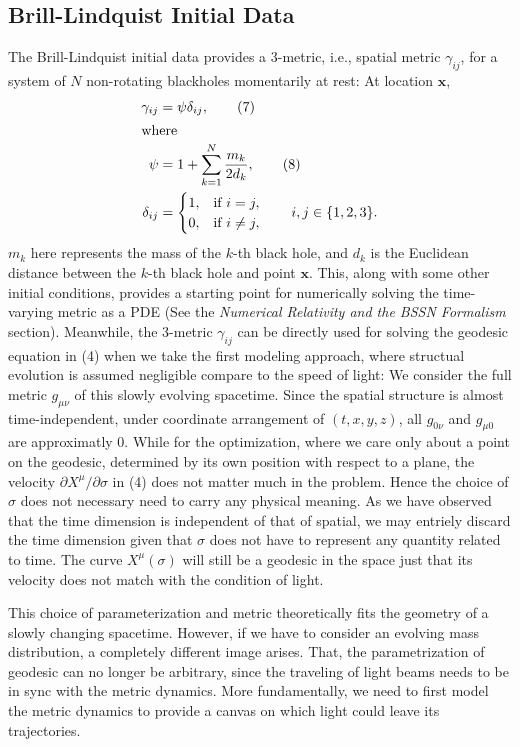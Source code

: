 \documentclass[conference]{IEEEtran}
\begin{document}
\subsection{Brill-Lindquist Initial Data}\label{AA}
The Brill-Lindquist initial data \cite{BLID}\cite{SID} provides a 3-metric, i.e., spatial metric $\gamma_{ij}$, 
for a system of $N$ non-rotating blackholes momentarily at rest: At location $\mathbf{x}$,
\begin{align*}
\gamma_{ij} &= \psi  \delta_{ij}, \tag{7}\\
\intertext{where}
\psi &= 1 + \sum_{k=1}^N \frac{m_k}{2d_k}, \tag{8}\\
\delta_{ij} &=
\begin{cases}
1, & \text{if } i = j,\\
0, & \text{if } i \neq j,
\end{cases}
\qquad i,j \in \{1,2,3\}.
\end{align*}
$m_k$ here represents the mass of the $k$-th black hole, and $d_k$ is the Euclidean 
distance between the $k$-th black hole and point $\mathbf{x}$. This, along with some other 
initial conditions, provides a starting point for numerically solving the 
time-varying metric as a PDE (See the \textit{Numerical Relativity and the BSSN Formalism} section). Meanwhile, the 
3-metric $\gamma_{ij}$ can be directly used for solving the geodesic equation in 
(4) when we take the first modeling approach, where structual evolution is assumed 
negligible compare to the speed of light: We consider the full metric $g_{\mu\nu}$ of 
this slowly evolving spacetime. Since the spatial structure is almost time-independent, under 
coordinate arrangement of $(t, x, y, z)$, all $g_{0\nu}$ and $g_{\mu0}$ are 
approximatly 0. While for the optimization, where we care only about a point on the geodesic, 
determined by its own position with respect to a plane, the velocity
$\partial X^\mu /\partial \sigma$ in (4) does not matter much in the problem. Hence the choice 
of $\sigma$ does not necessary need to carry any physical meaning. As we have observed that 
the time dimension is independent of that of spatial, we may entriely discard 
the time dimension given that $\sigma$ does not have to represent any quantity related to time. 
The curve $X^\mu(\sigma)$ will still be a geodesic in the space just that its velocity 
does not match with the condition of light. 

This choice of parameterization and metric theoretically fits the geometry of a slowly changing
spacetime. However, if we have to consider an evolving mass distribution, a completely different 
image arises. That, the parametrization of geodesic can no longer be arbitrary, since the 
traveling of light beams needs to be in sync with the metric dynamics. More fundamentally,
we need to first model the metric dynamics to provide a canvas on which light could leave its trajectories.
\end{document}
